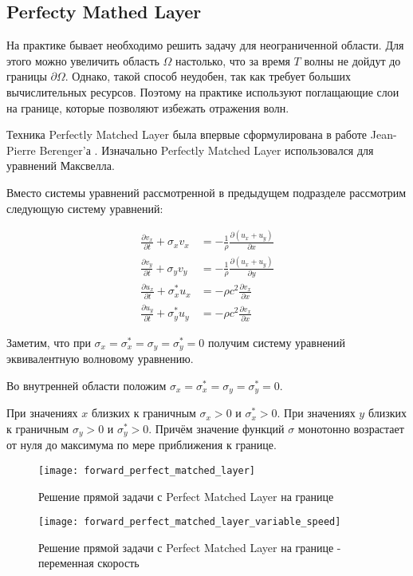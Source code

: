 \subsection{Perfecty Mathed Layer}

На практике бывает необходимо решить задачу для неограниченной области.
Для этого можно увеличить область \( \Omega \) настолько,
что за время \( T \) волны не дойдут до границы \( \partial \Omega \).
Однако, такой способ неудобен, так как требует больших вычислительных ресурсов.
Поэтому на практике используют поглащающие слои на границе,
которые позволяют избежать отражения волн.

Техника Perfectly Matched Layer была впервые сформулирована
в работе Jean-Pierre Berenger'а
\cite{a_perfectly_matched_layer_for_the_absorption_of_electromagnetic_waves}.
Изначально Perfectly Matched Layer использовался для уравнений Максвелла.
 

Вместо системы уравнений рассмотренной в предыдущем подразделе
рассмотрим следующую систему уравнений:

\begin{align*}
    \frac{\partial v_x}{\partial t} + \sigma_x v_x
    &= - \frac{1}{\rho} \frac{\partial \left( u_x + u_y \right) }{\partial x}
    \\
    \frac{\partial v_y}{\partial t} + \sigma_y v_y
    &= - \frac{1}{\rho} \frac{\partial \left( u_x + u_y \right) }{\partial y}
    \\
    \frac{\partial u_x}{\partial t} + \sigma_x^* u_x
    &= - \rho c^2 \frac{\partial v_x}{\partial x}
    \\
    \frac{\partial u_y}{\partial t} + \sigma_y^* u_y
    &= - \rho c^2 \frac{\partial v_x}{\partial x}
\end{align*}

Заметим, что при \( \sigma_x = \sigma_x^* = \sigma_y = \sigma_y^* = 0 \)
получим систему уравнений эквивалентную волновому уравнению.

Во внутренней области положим
\( \sigma_x = \sigma_x^* = \sigma_y = \sigma_y^* = 0 \).

При значениях \( x \) близких к граничным
\( \sigma_x > 0 \) и \( \sigma_x^* > 0 \).
При значениях \( y \) близких к граничным
\( \sigma_y > 0 \) и \( \sigma_y^* > 0 \).
Причём значение функций \( \sigma \) монотонно возрастает
от нуля до максимума по мере приближения к границе.

\begin{figure}
    \caption{Решение прямой задачи с Perfect Matched Layer на границе}
\noindent\texttt{[image: forward\_perfect\_matched\_layer]}
\end{figure}

\begin{figure}
    \caption{Решение прямой задачи с Perfect Matched Layer на границе - переменная скорость}
\noindent\texttt{[image: forward\_perfect\_matched\_layer\_variable\_speed]}
\end{figure}
